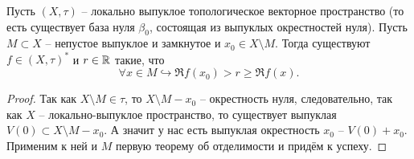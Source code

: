 \begin{theorem}\label{th:separability_second}
    Пусть $(X, \tau)$ -- локально выпуклое топологическое векторное пространство (то есть существует база нуля $\beta_0$, состоящая из выпуклых окрестностей нуля).
    Пусть $M \subset X$ -- непустое выпуклое и замкнутое и $x_0 \in X \setminus M$.
    Тогда существуют $f \in (X, \tau)^*$ и $ r \in \mathbb{R}$ такие, что
    \[
        \forall x \in M\hookrightarrow \Re f(x_0) > r \geq \Re f(x).
    \]
\end{theorem}
\begin{proof}
    Так как $X \setminus M \in \tau$, то $X \setminus M - x_0$ -- окрестность нуля, следовательно, так как $X$ -- локально-выпуклое пространство, то существует выпуклая $V(0) \subset X \setminus M - x_0$.
    А значит у нас есть выпуклая окрестность $x_0$ -- $V(0) + x_0$.
    Применим к ней и $M$ первую теорему об отделимости и придём к успеху.
\end{proof}